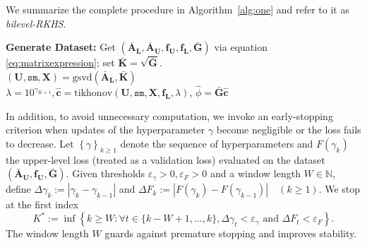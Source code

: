 \documentclass[12pt]{article}
\numberwithin{equation}{section}
\numberwithin{theorem}{section}
\begin{document}
We summarize the complete procedure in Algorithm~\ref{alg:one} and refer to it as \emph{bilevel-RKHS}.


\begin{algorithm}
\caption{GSVD-based bi-level optimization (bilevel-RKHS)}\label{alg:one}
\textbf{Generate Dataset:} Get $(\bar{\mathbf{A}}_\mathbf{L}, \bar{\mathbf{A}}_\mathbf{U}, \mathbf{f_U}, \mathbf{f_L}, \bar{\mathbf{G}})$ via equation \eqref{eq:matrixexpression}; set $\bar{\mathbf{K}} = \sqrt{\bar{\mathbf{G}}}$.\\

$(\mathbf{U},\texttt{sm},\mathbf{X}) = \mathrm{gsvd}(\bar{\mathbf{A}}_\mathbf{L},\bar{\mathbf{K}})$\\

$\lambda = 10^{\gamma_{K+1}} , \hat{\mathbf{c}} =  \mathrm{tikhonov}(\mathbf{U},\texttt{sm},\mathbf{X},\mathbf{f_L},\lambda )$, $\hat{\phi} = \bar{\mathbf{G}}\hat{\mathbf{c}}$\\
\KwOut{$\hat{\phi},\lambda$}
\end{algorithm}

In addition, to avoid unnecessary computation, we invoke an early-stopping criterion when updates of the hyperparameter $\gamma$ become negligible or the loss fails to decrease. Let $\left\{\gamma\right\}_{k \geq 1}$ denote the sequence of hyperparameters and $F\left(\gamma_k\right)$ the upper-level loss (treated as a validation loss) evaluated on the dataset $( \bar{\mathbf{A}}_\mathbf{U}, \mathbf{f_U}, \bar{\mathbf{G}})$. Given thresholds $\varepsilon_\gamma> 0, \varepsilon_F>0$ and a window length $W \in \mathbb{N}$, define $
\Delta \gamma_k:=\left|\gamma_k-\gamma_{k-1}\right|$ and $\Delta F_k:=\left|F\left(\gamma_k\right)-F\left(\gamma_{k-1}\right)\right| \quad(k \geq 1) $.
We stop at the first index
$$
K^{*}:=\inf \left\{k \geq W: \forall t \in\{k-W+1, \ldots, k\}, \Delta \gamma_t<\varepsilon_\gamma \text { and } \Delta F_t<\varepsilon_F\right\} .
$$
The window length $W$ guards against premature stopping and improves stability.
\end{document}
